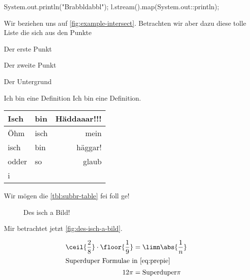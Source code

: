 \documentclass[userip,ngerman]{lecture-digital}
\begin{document}
\Blindtext[2]
\begin{java*}
System.out.println("Brabbldabbl");
l.stream().map(System.out::println);
\end{java*}
Wir beziehen uns auf \autoref{fig:example-intersect}. Betrachten wir aber dazu diese tolle Liste die sich aus den Punkte \begin{inlist}
    \item Der erste Punkt
    \item Der zweite Punkt
    \item Der Untergrund
\end{inlist}
\Blindtext[2]
\begin{definition}{Ich bin eine Definition}
    Ich bin eine Definition.
\end{definition}

\begin{table}[H]
    \centering%
    \label{tbl:subbr-table}
    \begin{tabular}{llr}
        \toprule
            Isch & bin & Häddaaar!!! \\
        \midrule
            Öhm & isch & mein \\
            isch & bin & häggar!\\
            odder & so & glaub \\
            i \\
        \bottomrule
    \end{tabular}
\end{table}
Wir mögen die \autoref{tbl:subbr-table} fei foll ge!
\Blindtext[1]
\begin{figure*}
    \centering{}
    \caption[Des isch a breites Bild!]{Des isch a Bild!}
    \label{fig:des-isch-a-bild}
\end{figure*}
Mir betrachtet jetzt \autoref{fig:des-isch-a-bild}.
\Blindtext[1]
\begin{wide}
    \begin{align}
        \ceil{\frac{2}{8}} \cdot \floor{\frac{1}{9}}& = \limn\abs{\frac{1}{n}} \label{eq:prepie}\\
        \intertext{Superduper Formulae in \autoref{eq:prepie}}
        12 \pi &= \text{Superduper}\pi
    \end{align}
\end{wide}
\Blindtext[8]
\end{document}
